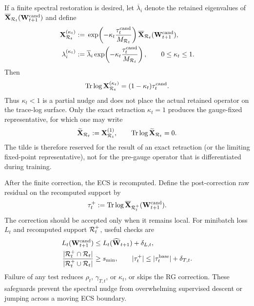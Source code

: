 If a finite spectral restoration is desired, let $\overline\lambda_i$ denote the retained eigenvalues of $\overline{\mathbf X}_{\mathcal R_t}(\mathbf W_{t+1}^{\rm cand})$ and define
\begin{equation}
\begin{aligned}
  \mathbf X_{\mathcal R_t}^{(\kappa_t)}
  &:={}
  \exp\!\left(
    -\kappa_t\frac{\tau_t^{\rm cand}}{M_{\mathcal R_t}}
  \right)
  \overline{\mathbf X}_{\mathcal R_t}(\mathbf W_{t+1}^{\rm cand}),\\
  \lambda_i^{(\kappa_t)}
  &:={}
  \overline\lambda_i
  \exp\!\left(
    -\kappa_t\frac{\tau_t^{\rm cand}}{M_{\mathcal R_t}}
  \right),
  \qquad 0\leq\kappa_t\leq1.
\end{aligned}
  \label{eq:partial_trace_log_restore}
\end{equation}
Then
\begin{equation}
  \operatorname{Tr}\log\mathbf X_{\mathcal R_t}^{(\kappa_t)}
  =
  (1-\kappa_t)\tau_t^{\rm cand}.
  \label{eq:partial_trace_log_residual}
\end{equation}
Thus $\kappa_t<1$ is a partial nudge and does not place the actual retained operator on the trace-log surface.  Only the exact retraction $\kappa_t=1$ produces the gauge-fixed representative, for which one may write
\begin{equation}
  \widetilde{\mathbf X}_{\mathcal R_t}
  :=
  \mathbf X_{\mathcal R_t}^{(1)},
  \qquad
  \operatorname{Tr}\log\widetilde{\mathbf X}_{\mathcal R_t}=0.
  \label{eq:exact_trace_log_retraction}
\end{equation}
The tilde is therefore reserved for the result of an exact retraction (or the limiting fixed-point representative), not for the pre-gauge operator that is differentiated during training.

After the finite correction, the ECS is recomputed.  Define the post-correction raw residual on the recomputed support by
\begin{equation}
  \tau_t^+
  :=
  \operatorname{Tr}\log\overline{\mathbf X}_{\mathcal R_t^+}(\mathbf W_{t+1}^{\rm cand}).
  \label{eq:recomputed_trace_log_residual}
\end{equation}
The correction should be accepted only when it remains local.  For minibatch loss $L_t$ and recomputed support $\mathcal R_t^+$, useful checks are
\begin{equation}
\begin{split}
  L_t(\mathbf W_{t+1}^{\rm cand})
  &\leq L_t(\widehat{\mathbf W}_{t+1})+\delta_{L,t},\\
  \frac{|\mathcal R_t^+\cap\mathcal R_t|}
       {|\mathcal R_t^+\cup\mathcal R_t|}
  &\geq s_{\min},
  \qquad
  |\tau_t^+|\leq|\tau_t^{\rm base}|+\delta_{T,t}.
\end{split}
\label{eq:optimizer_acceptance_tests}
\end{equation}
Failure of any test reduces $\rho_t$, $\gamma_{T,t}$, or $\kappa_t$, or skips the RG correction.  These safeguards prevent the spectral nudge from overwhelming supervised descent or jumping across a moving ECS boundary.

